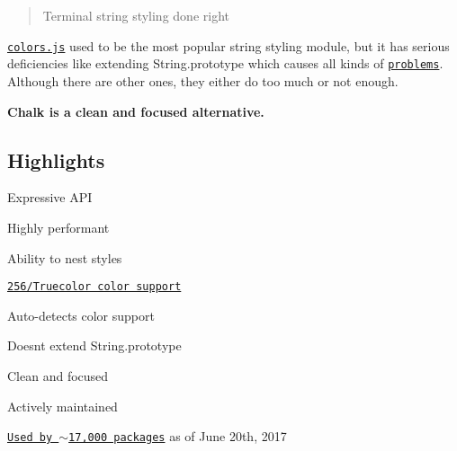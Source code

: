 \section*{~\newline
 ~\newline
  ~\newline
 ~\newline
 ~\newline
 }

\begin{quote}
Terminal string styling done right \end{quote}


\href{https://travis-ci.org/chalk/chalk}{\tt } \href{https://coveralls.io/github/chalk/chalk?branch=master}{\tt } \href{https://www.youtube.com/watch?v=9auOCbH5Ns4}{\tt } \href{https://github.com/sindresorhus/xo}{\tt }

\href{https://github.com/Marak/colors.js}{\tt colors.\+js} used to be the most popular string styling module, but it has serious deficiencies like extending {\ttfamily String.\+prototype} which causes all kinds of \href{https://github.com/yeoman/yo/issues/68}{\tt problems}. Although there are other ones, they either do too much or not enough.

{\bfseries Chalk is a clean and focused alternative.}



\subsection*{Highlights}


\begin{DoxyItemize}
\item Expressive A\+PI
\item Highly performant
\item Ability to nest styles
\item \href{#256-and-truecolor-color-support}{\tt 256/\+Truecolor color support}
\item Auto-\/detects color support
\item Doesn\textquotesingle{}t extend {\ttfamily String.\+prototype}
\item Clean and focused
\item Actively maintained
\item \href{https://www.npmjs.com/browse/depended/chalk}{\tt Used by $\sim$17,000 packages} as of June 20th, 2017
\end{DoxyItemize}

